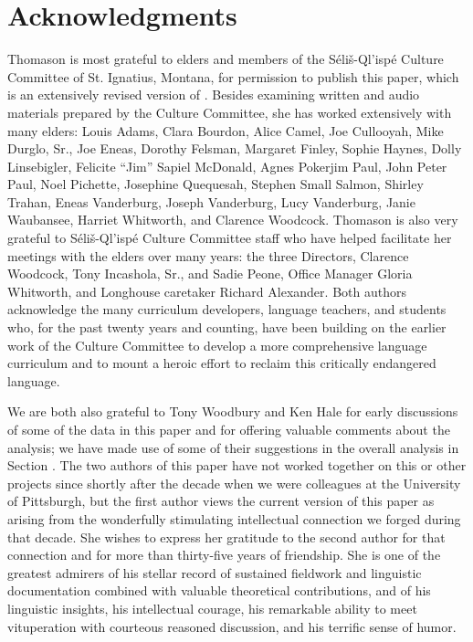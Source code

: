 \documentclass[output=paper,colorlinks,citecolor=brown]{langscibook}
\begin{document}
\section*{Acknowledgments}

Thomason is most
   grateful to elders and members of the S\'eli\v{s}-Ql'isp\'e
   Culture Committee of St. Ignatius, Montana, for permission to
   publish this paper, which is an extensively revised version of
   .  Besides examining written and
   audio materials prepared by the Culture Committee, she has worked
   extensively with many elders: {\dag}Louis Adams, {\dag}Clara
   Bourdon, {\dag}Alice Camel, {\dag}Joe Cullooyah, {\dag}Mike
   Durglo, Sr., {\dag}Joe Eneas, {\dag}Dorothy Felsman,
   {\dag}Margaret Finley, Sophie Haynes, {\dag}Dolly Linsebigler,
   {\dag}Felicite ``Jim'' Sapiel McDonald, {\dag}Agnes Pokerjim Paul,
   {\dag}John Peter Paul, {\dag}Noel Pichette, {\dag}Josephine
   Quequesah, Stephen Small Salmon, Shirley Trahan, {\dag}Eneas
   Vanderburg, {\dag}Joseph Vanderburg, Lucy Vanderburg, {\dag}Janie
   Waubansee, {\dag}Harriet Whitworth, and {\dag}Clarence Woodcock.
   Thomason is also very grateful to S\'eli\v{s}-Ql'isp\'e Culture
   Committee staff who have helped facilitate her meetings with the
   elders over many years: the three Directors, {\dag}Clarence
 Woodcock, {\dag}Tony Incashola, Sr., and Sadie Peone, Office Manager
 {\dag}Gloria Whitworth, and Longhouse caretaker Richard Alexander.
 Both authors acknowledge the many curriculum developers, language
 teachers, and students who, for the past twenty years and counting,
 have been building on the earlier work of the Culture Committee to
 develop a more comprehensive language curriculum and to mount a
 heroic effort to reclaim this critically endangered language.

   We are both also grateful to Tony Woodbury and {\dag}Ken Hale for
   early discussions of some of the data in this paper and for
   offering valuable comments about the analysis; we have made use of
   some of their suggestions in the overall analysis in Section .  The
   two authors of this paper have not worked together on this or
   other projects since shortly after the decade when we were
   colleagues at the University of Pittsburgh, but the first author
   views the current version of this paper as arising from the
   wonderfully stimulating intellectual connection we forged during
   that decade.  She wishes to express her gratitude to the second
   author for that connection and for more than thirty-five years of
   friendship.  She is one of the greatest admirers of his stellar
   record of sustained fieldwork and linguistic documentation
   combined with valuable theoretical contributions, and of his
   linguistic insights, his intellectual courage, his remarkable
   ability to meet vituperation with courteous reasoned discussion,
   and his terrific sense of humor.



\sloppy
\printbibliography[heading=subbibliography,notkeyword=this]
\end{document}
